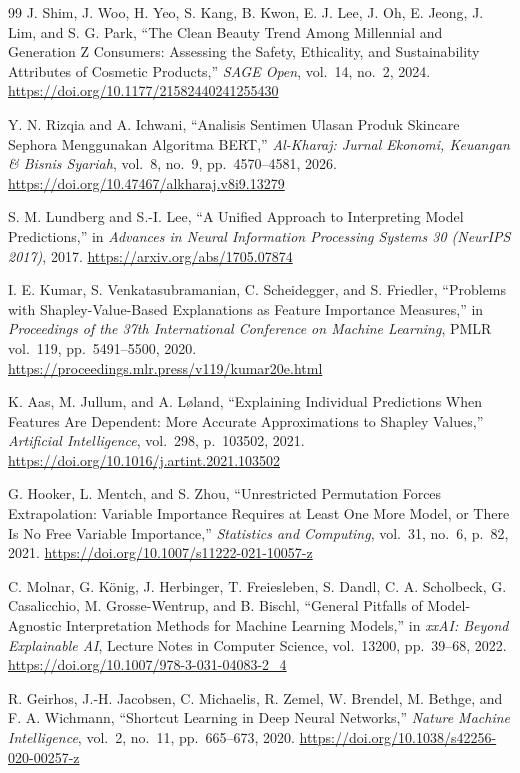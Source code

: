 \documentclass[11pt,a4paper]{article}
\begin{document}
\begin{thebibliography}{99}
J. Shim, J. Woo, H. Yeo, S. Kang, B. Kwon, E. J. Lee, J. Oh, E. Jeong, J. Lim, and S. G. Park, ``The Clean Beauty Trend Among Millennial and Generation Z Consumers: Assessing the Safety, Ethicality, and Sustainability Attributes of Cosmetic Products,'' \emph{SAGE Open}, vol.~14, no.~2, 2024. \url{https://doi.org/10.1177/21582440241255430}

Y. N. Rizqia and A. Ichwani, ``Analisis Sentimen Ulasan Produk Skincare Sephora Menggunakan Algoritma BERT,'' \emph{Al-Kharaj: Jurnal Ekonomi, Keuangan \& Bisnis Syariah}, vol.~8, no.~9, pp.~4570--4581, 2026. \url{https://doi.org/10.47467/alkharaj.v8i9.13279}

S. M. Lundberg and S.-I. Lee, ``A Unified Approach to Interpreting Model Predictions,'' in \emph{Advances in Neural Information Processing Systems 30 (NeurIPS 2017)}, 2017. \url{https://arxiv.org/abs/1705.07874}

I. E. Kumar, S. Venkatasubramanian, C. Scheidegger, and S. Friedler, ``Problems with Shapley-Value-Based Explanations as Feature Importance Measures,'' in \emph{Proceedings of the 37th International Conference on Machine Learning}, PMLR vol.~119, pp.~5491--5500, 2020. \url{https://proceedings.mlr.press/v119/kumar20e.html}

K. Aas, M. Jullum, and A. L{\o}land, ``Explaining Individual Predictions When Features Are Dependent: More Accurate Approximations to Shapley Values,'' \emph{Artificial Intelligence}, vol.~298, p.~103502, 2021. \url{https://doi.org/10.1016/j.artint.2021.103502}

G. Hooker, L. Mentch, and S. Zhou, ``Unrestricted Permutation Forces Extrapolation: Variable Importance Requires at Least One More Model, or There Is No Free Variable Importance,'' \emph{Statistics and Computing}, vol.~31, no.~6, p.~82, 2021. \url{https://doi.org/10.1007/s11222-021-10057-z}

C. Molnar, G. K\"{o}nig, J. Herbinger, T. Freiesleben, S. Dandl, C. A. Scholbeck, G. Casalicchio, M. Grosse-Wentrup, and B. Bischl, ``General Pitfalls of Model-Agnostic Interpretation Methods for Machine Learning Models,'' in \emph{xxAI: Beyond Explainable AI}, Lecture Notes in Computer Science, vol.~13200, pp.~39--68, 2022. \url{https://doi.org/10.1007/978-3-031-04083-2_4}

R. Geirhos, J.-H. Jacobsen, C. Michaelis, R. Zemel, W. Brendel, M. Bethge, and F. A. Wichmann, ``Shortcut Learning in Deep Neural Networks,'' \emph{Nature Machine Intelligence}, vol.~2, no.~11, pp.~665--673, 2020. \url{https://doi.org/10.1038/s42256-020-00257-z}


\end{thebibliography}
\end{document}
